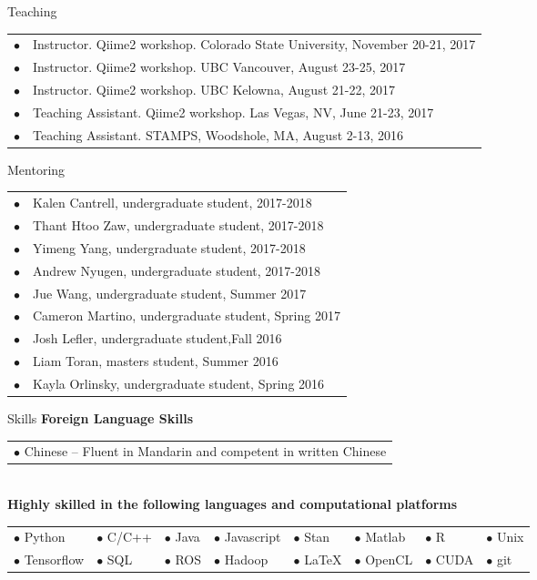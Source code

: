 \documentclass{resume} %
\begin{document}
\begin{rSection}{Teaching}
  \begin{tabular}{ll}
    $\bullet$ & Instructor. Qiime2 workshop. Colorado State University, November 20-21, 2017 \\
    $\bullet$ & Instructor. Qiime2 workshop. UBC Vancouver, August 23-25, 2017 \\
    $\bullet$ & Instructor. Qiime2 workshop. UBC Kelowna, August 21-22, 2017 \\
    $\bullet$ & Teaching Assistant. Qiime2 workshop. Las Vegas, NV, June 21-23, 2017 \\
    $\bullet$ & Teaching Assistant. STAMPS, Woodshole, MA, August 2-13, 2016 \\
  \end{tabular}
\end{rSection}\newpage
\begin{rSection}{Mentoring}
  \begin{tabular}{ll}
    $\bullet$  &   Kalen Cantrell, undergraduate student, 2017-2018 \\
    $\bullet$  &   Thant Htoo Zaw, undergraduate student, 2017-2018 \\
    $\bullet$  &   Yimeng Yang, undergraduate student, 2017-2018 \\
    $\bullet$  &   Andrew Nyugen, undergraduate student, 2017-2018 \\
    $\bullet$  &   Jue Wang, undergraduate student, Summer 2017 \\
    $\bullet$  &   Cameron Martino, undergraduate student, Spring 2017 \\
    $\bullet$  &   Josh Lefler, undergraduate student,Fall 2016 \\
    $\bullet$  &   Liam Toran, masters student, Summer 2016 \\
    $\bullet$  &   Kayla Orlinsky, undergraduate student, Spring 2016 \\
  \end{tabular}
\end{rSection}
\begin{rSection}{Skills}
  \textbf{Foreign Language Skills}\\
  \begin{tabular}{l}
    $\bullet$ Chinese --  Fluent in Mandarin and competent in written Chinese\\
  \end{tabular}\\
  \textbf{Highly skilled in the following languages and computational platforms}\\
  \begin{tabular}{llllllll}
     $\bullet$ Python   &  $\bullet$ C/C++ &  $\bullet$ Java  & $\bullet$ Javascript & $\bullet$ Stan & $\bullet$ Matlab   &  $\bullet$ R     &  $\bullet$ Unix \\
     $\bullet$ Tensorflow & $\bullet$ SQL & $\bullet$ ROS &  $\bullet$ Hadoop &  $\bullet$ \LaTeX &  $\bullet$ OpenCL   &  $\bullet$ CUDA   &   $\bullet$ git\\
  \end{tabular}
\end{rSection}
\end{document}
